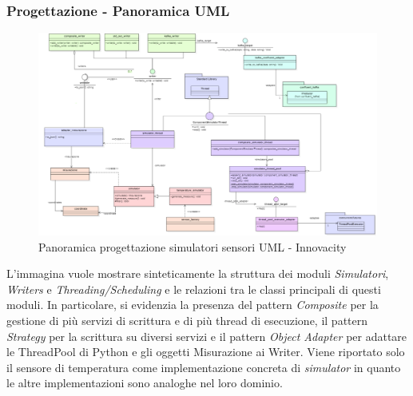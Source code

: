 \subsubsection{Progettazione - Panoramica UML }
\begin{figure}[H]
    \centering
    \includegraphics[width=1.1\textwidth]{../Images/SpecificaTecnica/progettazioneCompSimulatori.PNG}
    \caption{Panoramica progettazione simulatori sensori UML - Innovacity}
    \label{fig: panor_sim}
\end{figure}
L'immagina vuole mostrare sinteticamente la struttura dei moduli \textit{Simulatori}, \textit{Writers} e \textit{Threading/Scheduling} e le relazioni tra le classi principali di questi moduli. In particolare, si evidenzia la presenza del pattern \textit{Composite} per la gestione di più servizi di scrittura e di più thread di esecuzione, il pattern \textit{Strategy} per la scrittura su diversi servizi e il pattern \textit{Object Adapter} per adattare le ThreadPool di Python e gli oggetti Misurazione ai Writer. 
Viene riportato solo il sensore di temperatura come implementazione concreta di \textit{simulator} in quanto le altre implementazioni sono analoghe nel loro dominio.